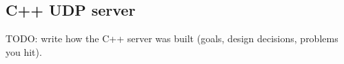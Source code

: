 \documentclass[11pt]{article}
\begin{document}
\subsection{C++ UDP server}
TODO: write how the C++ server was built (goals, design decisions, problems you hit).
\end{document}

